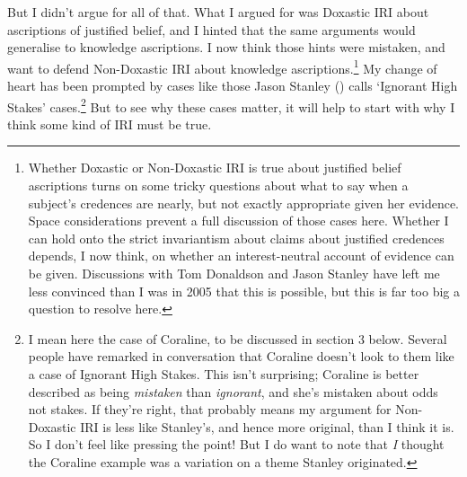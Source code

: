 \documentclass[
  10pt,
  letterpaper,
  DIV=11,
  numbers=noendperiod,
  twoside]{scrartcl}
\begin{document}
But I didn't argue for all of that. What I argued for was Doxastic IRI
about ascriptions of justified belief, and I hinted that the same
arguments would generalise to knowledge ascriptions. I now think those
hints were mistaken, and want to defend Non-Doxastic IRI about knowledge
ascriptions.\footnote{Whether Doxastic or Non-Doxastic IRI is true about
  justified belief ascriptions turns on some tricky questions about what
  to say when a subject's credences are nearly, but not exactly
  appropriate given her evidence. Space considerations prevent a full
  discussion of those cases here. Whether I can hold onto the strict
  invariantism about claims about justified credences depends, I now
  think, on whether an interest-neutral account of evidence can be
  given. Discussions with Tom Donaldson and Jason Stanley have left me
  less convinced than I was in 2005 that this is possible, but this is
  far too big a question to resolve here.} My change of heart has been
prompted by cases like those Jason Stanley
() calls `Ignorant High Stakes'
cases.\footnote{I mean here the case of Coraline, to be discussed in
  section 3 below. Several people have remarked in conversation that
  Coraline doesn't look to them like a case of Ignorant High Stakes.
  This isn't surprising; Coraline is better described as being
  \emph{mistaken} than \emph{ignorant}, and she's mistaken about odds
  not stakes. If they're right, that probably means my argument for
  Non-Doxastic IRI is less like Stanley's, and hence more original, than
  I think it is. So I don't feel like pressing the point! But I do want
  to note that \emph{I} thought the Coraline example was a variation on
  a theme Stanley originated.} But to see why these cases matter, it
will help to start with why I think some kind of IRI must be true.
\end{document}
